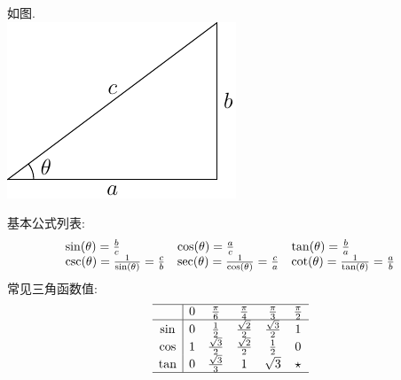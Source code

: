 \documentclass[UTTF8, fontset=ubuntu]{ctexart}
\begin{document}
如图.\\
\includegraphics{triangel.pdf}

基本公式列表:\\
\begin{displaymath}
\begin{array}{l l l}
    \sin(\theta)=\frac{b}{c} & \cos(\theta)=\frac{a}{c} & \tan(\theta)=\frac{b}{a}\\
    \csc(\theta)=\frac{1}{\sin(\theta)}=\frac{c}{b} & \sec(\theta)=\frac{1}{\cos(\theta)}=\frac{c}{a} & \cot(\theta)=\frac{1}{\tan(\theta)}=\frac{a}{b}
\end{array}
\end{displaymath}
常见三角函数值:
\begin{displaymath}
\begin{array}{c|c c c c c}
\hline
    & 0 & \frac{\pi}{6} & \frac{\pi}{4} & \frac{\pi}{3} & \frac{\pi}{2}\\
\hline
    \sin & 0 & \frac{1}{2} & \frac{\sqrt{2}}{2} & \frac{\sqrt{3}}{2} & 1\\
    \cos & 1 & \frac{\sqrt{3}}{2} & \frac{\sqrt{2}}{2} & \frac{1}{2} & 0\\
    \tan & 0 & \frac{\sqrt{3}}{3} & 1 & \sqrt{3} & \star\\
\hline
\end{array}
\end{displaymath}
\end{document}
